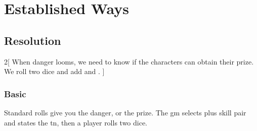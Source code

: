 \chapter{Established Ways}
\label{coreRules}


\section{Resolution}
\label{basicaction}


\begin{multicols}{2}[%
  \noindent%
  When danger looms, we need to know if the characters can obtain their prize.
  We roll two dice and add  and .
]

\newcommand{\TNChart}{

  \noindent
  \begin{boxtable}[cX]

    \textbf{\glsentrytext{tn}} & \textbf{Task} \\\hline

    2 & Automatic \\

    4 & Trivial \\

    6 & Easy \\

    8 & Serious \\

    10 & Tricky \\

    12 & Professional \\

    14 & Specialist \\

    16 & Extreme \\

    18 & Legendary \\

    20 & Implausible \\

  \end{boxtable}
}

\subsection{Basic }
Standard rolls give you the danger, or the prize.
The \gls{gm} selects  plus \gls{skill} pair and states the \gls{tn}, then a player rolls two dice.


\end{multicols}
